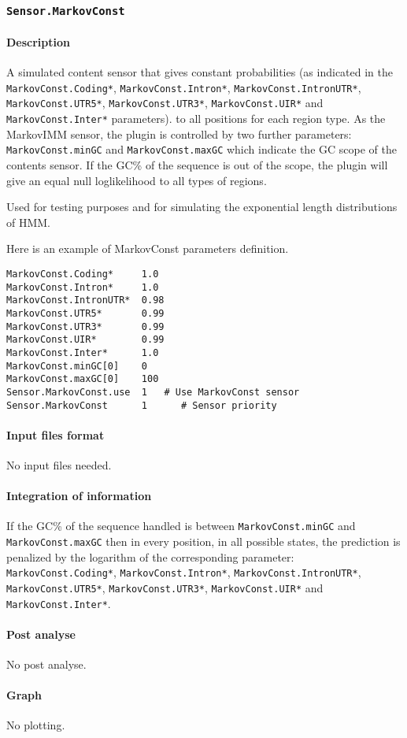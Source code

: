 
\subsubsection{\texttt{Sensor.MarkovConst}}

\paragraph{Description}

A simulated content sensor that gives constant probabilities (as
indicated in the \texttt{MarkovConst\-.Coding*},
\texttt{MarkovConst.Intron*}, \texttt{MarkovConst.IntronUTR*}, \texttt{MarkovConst.UTR5*},
\texttt{Mark\-ovConst.UTR3*}, \texttt{MarkovConst.UIR*} and \texttt{MarkovConst.Inter*} parameters).
to all positions for each region type. As the MarkovIMM sensor, the
plugin is controlled by two further parameters:
\texttt{MarkovConst.minGC} and \texttt{MarkovConst.maxGC} which
indicate the GC scope of the contents sensor. If the GC\% of the
sequence is out of the scope, the plugin will give an equal null
loglikelihood to all types of regions.

Used for testing purposes and for simulating the exponential length
distributions of HMM.

Here is an example of MarkovConst parameters definition.
\begin{Verbatim}[fontsize=\small]
MarkovConst.Coding*     1.0
MarkovConst.Intron*     1.0
MarkovConst.IntronUTR*  0.98
MarkovConst.UTR5*       0.99
MarkovConst.UTR3*       0.99
MarkovConst.UIR*        0.99
MarkovConst.Inter*      1.0
MarkovConst.minGC[0]    0
MarkovConst.maxGC[0]    100
Sensor.MarkovConst.use  1   # Use MarkovConst sensor
Sensor.MarkovConst      1      # Sensor priority
\end{Verbatim}

\paragraph{Input files format}

No input files  needed.

\paragraph{Integration of information}

If the GC\% of the sequence handled is between
\texttt{MarkovConst.minGC} and \texttt{MarkovConst.maxGC} then in
every position, in all possible states, the prediction is penalized by
the logarithm of the corresponding parameter:
\texttt{MarkovConst.Coding*}, \texttt{MarkovConst.Intron*}, \texttt{MarkovConst.IntronUTR*},
\texttt{MarkovConst.UTR5*}, \texttt{MarkovConst.UTR3*}, \texttt{MarkovConst.UIR*} and
\texttt{MarkovConst.Inter*}.

\paragraph{Post analyse}

No post analyse.

\paragraph{Graph}

No plotting.

